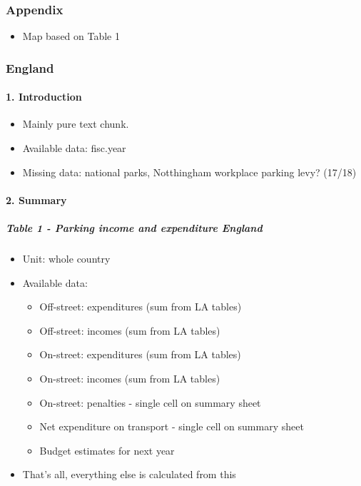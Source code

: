 \documentclass[]{article}
\providecommand{\tightlist}{%
  \setlength{\itemsep}{0pt}\setlength{\parskip}{0pt}}
\let\oldparagraph\paragraph
\renewcommand{\paragraph}[1]{\oldparagraph{#1}\mbox{}}
\let\oldsubparagraph\subparagraph
\renewcommand{\subparagraph}[1]{\oldsubparagraph{#1}\mbox{}}
\begin{document}
\hypertarget{appendix}{%
\subsubsection{Appendix}\label{appendix}}

\begin{itemize}
\tightlist
\item
  Map based on Table 1
\end{itemize}

\hypertarget{england}{%
\subsubsection{England}\label{england}}

\hypertarget{introduction-1}{%
\paragraph{1. Introduction}\label{introduction-1}}

\begin{itemize}
\tightlist
\item
  Mainly pure text chunk.
\item
  Available data: fisc.year
\item
  Missing data: national parks, Notthingham workplace parking levy?
  (17/18)
\end{itemize}

\hypertarget{summary-1}{%
\paragraph{2. Summary}\label{summary-1}}

\hypertarget{table-1---parking-income-and-expenditure-england}{%
\subparagraph{Table 1 - Parking income and expenditure
England}\label{table-1---parking-income-and-expenditure-england}}

\begin{itemize}
\tightlist
\item
  Unit: whole country
\item
  Available data:

  \begin{itemize}
  \tightlist
  \item
    Off-street: expenditures (sum from LA tables)
  \item
    Off-street: incomes (sum from LA tables)
  \item
    On-street: expenditures (sum from LA tables)
  \item
    On-street: incomes (sum from LA tables)
  \item
    On-street: penalties - single cell on summary sheet
  \item
    Net expenditure on transport - single cell on summary sheet
  \item
    Budget estimates for next year
  \end{itemize}
\item
  That's all, everything else is calculated from this
\end{itemize}
\end{document}
